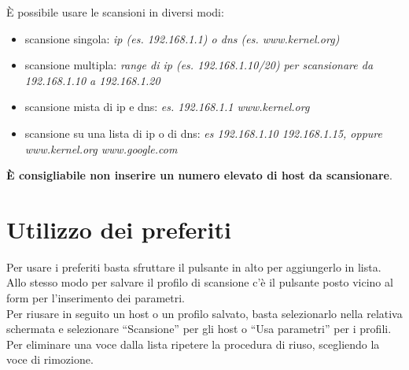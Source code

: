 \`E possibile usare le scansioni in diversi modi:
\begin{itemize}
\item scansione singola: \emph{ip (es. 192.168.1.1) o dns (es. www.kernel.org)}
\item scansione multipla: \emph{range di ip (es. 192.168.1.10/20) per scansionare 
  da 192.168.1.10 a 192.168.1.20}
\item scansione mista di ip e dns: \emph{es. 192.168.1.1 www.kernel.org}
\item scansione su una lista di ip o di dns: \emph{es 192.168.1.10 192.168.1.15, 
  oppure www.kernel.org www.google.com}
\end{itemize}
\textbf{\`E consigliabile non inserire un numero elevato di host da scansionare}.

\section{Utilizzo dei preferiti}
\label{sec:ExamplesUseBookmarks}

Per usare i preferiti basta sfruttare il pulsante in alto per aggiungerlo in lista.\\
Allo stesso modo per salvare il profilo di scansione c'\`e il pulsante posto vicino 
al form per l'inserimento dei parametri.\\
Per riusare in seguito un host o un profilo salvato, basta selezionarlo nella relativa 
schermata e selezionare ``Scansione'' per gli host o ``Usa parametri'' per i profili.\\ 
Per eliminare una voce dalla lista ripetere la procedura di riuso, scegliendo la voce di 
rimozione.
